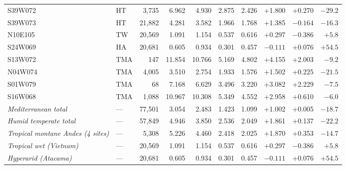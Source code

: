 \begin{table}[t]
{\begin{tabular}{llrrrrrrrr}
S39W072 & HT & 3,735 & 6.962 & 4.930 & 2.875 & 2.426 & +1.800 & +0.270 & $-29.2$ \\
S39W073 & HT & 21,882 & 4.281 & 3.582 & 1.966 & 1.768 & +1.385 & $-0.164$ & $-16.3$ \\
\addlinespace[2pt]
N10E105 & TW & 20,569 & 1.091 & 1.154 & 0.537 & 0.616 & +0.297 & $-0.386$ & $+5.8$ \\
S24W069 & HA & 20,681 & 0.605 & 0.934 & 0.301 & 0.457 & $-0.111$ & +0.076 & $+54.5$ \\
S13W072 & TMA &  147 & 11.854 & 10.766 & 5.169 & 4.802 & +4.155 & +2.003 & $-9.2$ \\
N04W074 & TMA & 4,005 & 3.510 & 2.754 & 1.933 & 1.576 & +1.502 & +0.225 & $-21.5$ \\
S01W079 & TMA &   68 & 7.168 & 6.629 & 3.496 & 3.220 & +3.082 & +2.229 & $-7.5$ \\
S16W068 & TMA & 1,088 & 10.967 & 10.308 & 5.349 & 4.552 & +2.958 & +0.610 & $-6.0$ \\
\midrule
\textit{Mediterranean total} & --- & 77,501 & 3.054 & 2.483 & 1.423 & 1.099 & +1.002 & +0.005 & $-18.7$ \\
\textit{Humid temperate total} & --- & 57,849 & 4.946 & 3.850 & 2.536 & 2.049 & +1.861 & +0.137 & $-22.2$ \\
\textit{Tropical montane Andes (4 sites)} & --- & 5,308 & 5.226 & 4.460 & 2.418 & 2.025 & +1.870 & +0.353 & $-14.7$ \\
\textit{Tropical wet (Vietnam)} & --- & 20,569 & 1.091 & 1.154 & 0.537 & 0.616 & +0.297 & $-0.386$ & $+5.8$ \\
\textit{Hyperarid (Atacama)} & --- & 20,681 & 0.605 & 0.934 & 0.301 & 0.457 & $-0.111$ & +0.076 & $+54.5$ \\
\bottomrule
\end{tabular}%
}
\end{table}
